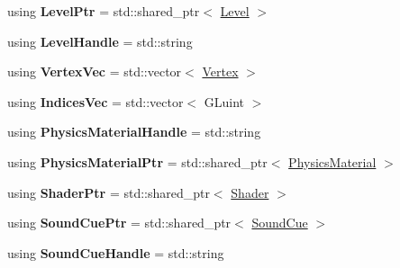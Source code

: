 \begin{DoxyCompactItemize}
\item 
\hypertarget{namespaceDCEngine_ac0662137e1800c2aa8dca31c0d329de7}{using {\bfseries Level\-Ptr} = std\-::shared\-\_\-ptr$<$ \hyperlink{classDCEngine_1_1Level}{Level} $>$}\label{namespaceDCEngine_ac0662137e1800c2aa8dca31c0d329de7}

\item 
\hypertarget{namespaceDCEngine_a3bab6c6472ec812d64ec61e7662fbcff}{using {\bfseries Level\-Handle} = std\-::string}\label{namespaceDCEngine_a3bab6c6472ec812d64ec61e7662fbcff}

\item 
\hypertarget{namespaceDCEngine_ab5c296a2a9d5e12eea9c50051adeddf1}{using {\bfseries Vertex\-Vec} = std\-::vector$<$ \hyperlink{structDCEngine_1_1Vertex}{Vertex} $>$}\label{namespaceDCEngine_ab5c296a2a9d5e12eea9c50051adeddf1}

\item 
\hypertarget{namespaceDCEngine_a8901fd21b8775ddf6f41e90109786574}{using {\bfseries Indices\-Vec} = std\-::vector$<$ G\-Luint $>$}\label{namespaceDCEngine_a8901fd21b8775ddf6f41e90109786574}

\item 
\hypertarget{namespaceDCEngine_ae403ab188814569d0880c6f9d4ef32c4}{using {\bfseries Physics\-Material\-Handle} = std\-::string}\label{namespaceDCEngine_ae403ab188814569d0880c6f9d4ef32c4}

\item 
\hypertarget{namespaceDCEngine_a7b46e51e8a42771f646fb7ac87525485}{using {\bfseries Physics\-Material\-Ptr} = std\-::shared\-\_\-ptr$<$ \hyperlink{classDCEngine_1_1PhysicsMaterial}{Physics\-Material} $>$}\label{namespaceDCEngine_a7b46e51e8a42771f646fb7ac87525485}

\item 
\hypertarget{namespaceDCEngine_a1958fe3673e5aa7449d8374138efc90a}{using {\bfseries Shader\-Ptr} = std\-::shared\-\_\-ptr$<$ \hyperlink{classDCEngine_1_1Shader}{Shader} $>$}\label{namespaceDCEngine_a1958fe3673e5aa7449d8374138efc90a}

\item 
\hypertarget{namespaceDCEngine_a23fd37dddf160553f9a0d4bf83cddd9e}{using {\bfseries Sound\-Cue\-Ptr} = std\-::shared\-\_\-ptr$<$ \hyperlink{classDCEngine_1_1SoundCue}{Sound\-Cue} $>$}\label{namespaceDCEngine_a23fd37dddf160553f9a0d4bf83cddd9e}

\item 
\hypertarget{namespaceDCEngine_a49196c2f5a09b4cf6013e52006c175dc}{using {\bfseries Sound\-Cue\-Handle} = std\-::string}\label{namespaceDCEngine_a49196c2f5a09b4cf6013e52006c175dc}


\end{DoxyCompactItemize}
